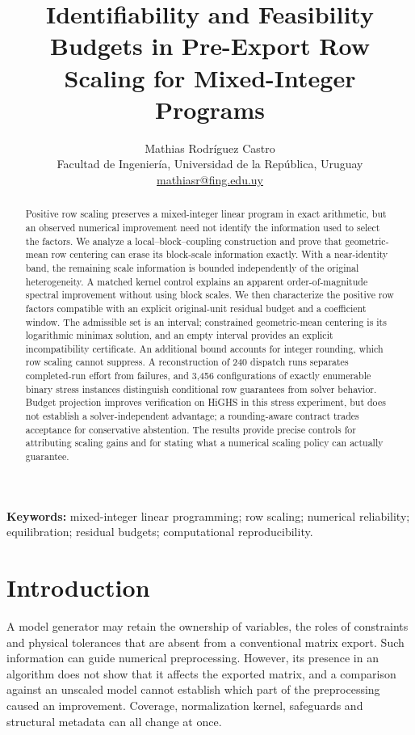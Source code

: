 \documentclass[11pt]{article}
\title{Identifiability and Feasibility Budgets in Pre-Export Row Scaling for Mixed-Integer Programs}
\author{Mathias Rodr\'iguez Castro\\
\small Facultad de Ingenier\'ia, Universidad de la Rep\'ublica, Uruguay\\
\small\href{mailto:mathiasr@fing.edu.uy}{mathiasr@fing.edu.uy}}
\date{}
\theoremstyle{definition}
\theoremstyle{remark}
\begin{document}
\maketitle
\begin{abstract}
Positive row scaling preserves a mixed-integer linear program in exact arithmetic, but
an observed numerical improvement need not identify the information used to select the
factors. We analyze a local--block--coupling construction and prove that geometric-mean
row centering can erase its block-scale information exactly. With a near-identity band,
the remaining scale information is bounded independently of the original heterogeneity.
A matched kernel control explains an apparent order-of-magnitude spectral improvement
without using block scales. We then characterize the positive row factors compatible
with an explicit original-unit residual budget and a coefficient window. The admissible
set is an interval; constrained geometric-mean centering is its logarithmic minimax
solution, and an empty interval provides an explicit incompatibility certificate.
An additional bound accounts for integer rounding, which row scaling cannot suppress.
A reconstruction of 240 dispatch runs separates completed-run effort from failures,
and 3,456 configurations of exactly enumerable binary stress instances distinguish
conditional row guarantees from solver behavior. Budget projection improves verification
on HiGHS in this stress experiment, but does not establish a solver-independent advantage;
a rounding-aware contract trades acceptance for conservative abstention. The results
provide precise controls for attributing scaling gains and for stating what a numerical
scaling policy can actually guarantee.
\end{abstract}
\noindent\textbf{Keywords:} mixed-integer linear programming; row scaling; numerical
reliability; equilibration; residual budgets; computational reproducibility.
\linenumbers

\section{Introduction}
A model generator may retain the ownership of variables, the roles of constraints and
physical tolerances that are absent from a conventional matrix export. Such information
can guide numerical preprocessing. However, its presence in an algorithm does not show
that it affects the exported matrix, and a comparison against an unscaled model cannot
establish which part of the preprocessing caused an improvement. Coverage, normalization
kernel, safeguards and structural metadata can all change at once.
\end{document}

